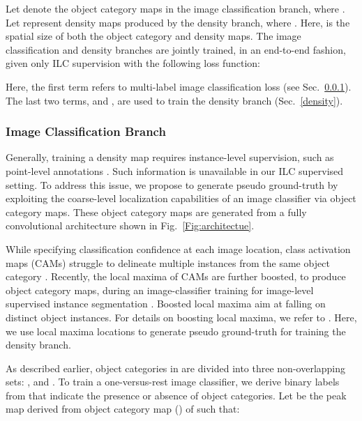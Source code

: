 \documentclass[10pt,twocolumn,letterpaper]{article}
\begin{document}
Let 
 denote the object category maps in the image classification branch, where . Let  represent density maps produced by the density branch, where . Here,
  is the spatial size of both the object category and density maps. The image classification and density branches are jointly trained, in an end-to-end fashion, given only ILC supervision with the following loss function:
\vspace{-0.1cm}

Here, the first term refers to  multi-label image classification loss \cite{multilabelsoftmargin} (see Sec.~\ref{peakstimulation}).  The last two terms,  and , are used to train the density branch (Sec.~\ref{density}). 
\vspace{-0.3cm}
\subsubsection{Image Classification Branch}
\label{peakstimulation}
Generally, training a density map requires instance-level supervision, such as point-level annotations \cite{OxfordDensityNIPS2010}. Such information is unavailable in our ILC supervised setting. To address this issue, we propose to generate pseudo ground-truth by exploiting the coarse-level localization capabilities of an image classifier \cite{oquab2015object, CAM} via object category maps.  These object category maps are generated from a fully convolutional architecture shown in Fig.~\ref{Fig:architectue}. 

While specifying classification confidence at each image location, class activation maps (CAMs) struggle to delineate multiple instances from the same object category \cite{oquab2015object, CAM}. Recently, the local maxima of CAMs are further boosted, to produce object category maps, during an image-classifier training for image-level supervised instance segmentation \cite{PRM}. Boosted local maxima  aim at falling on distinct object instances. For details on boosting local maxima, we refer to \cite{PRM}. Here, we use local maxima  locations to generate pseudo ground-truth for training the density branch.



As described earlier, object categories in  are divided into three non-overlapping sets: ,  and . To train a one-versus-rest image classifier, we derive
binary labels from  that indicate the presence  or absence   of object categories. Let  be the peak map derived from  object category map () of  such that:
\vspace{-0.1cm}
\end{document}
